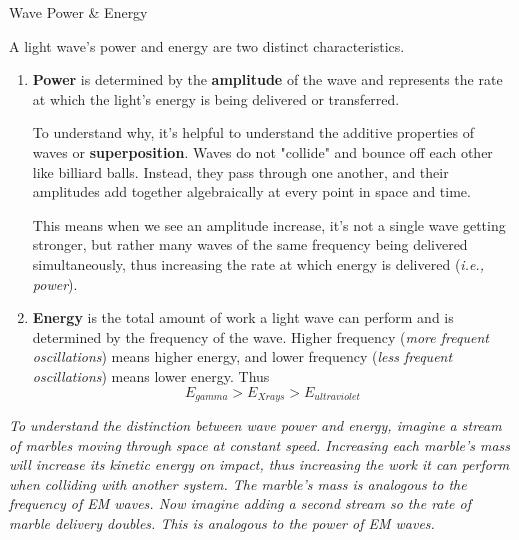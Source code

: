 \documentclass[10pt]{article}
\begin{document}
    \begin{core}{Wave Power \& Energy}

      A light wave's power and energy are two distinct characteristics.

      \begin{enumerate}

        \item \textbf{Power} is determined by the \textbf{amplitude} of the wave and represents the rate at which the light's energy is being delivered or transferred.


        To understand why, it's helpful to understand the additive properties of waves or \textbf{superposition}. Waves do not "collide" and bounce off each other like billiard balls. Instead, they pass through one another, and their amplitudes add together algebraically at every point in space and time.


        This means when we see an amplitude increase, it's not a single wave getting stronger, but rather many waves of the same frequency being delivered simultaneously, thus increasing the rate at which energy is delivered (\textit{i.e., power}).

        \item \textbf{Energy} is the total amount of work a light wave can perform and is determined by the frequency of the wave. Higher frequency (\textit{more frequent oscillations}) means higher energy, and lower frequency (\textit{less frequent oscillations}) means lower energy. Thus
        \[
          E_{gamma} > E_{Xrays} > E_{ultraviolet}
        \]

      \end{enumerate}
      
      \textit{To understand the distinction between wave power and energy, imagine a stream of marbles moving through space at constant speed. Increasing each marble's mass will increase its kinetic energy on impact, thus increasing the work it can perform when colliding with another system. The marble's mass is analogous to the frequency of EM waves. Now imagine adding a second stream so the rate of marble delivery doubles. This is analogous to the power of EM waves.}

    \end{core}
\end{document}
